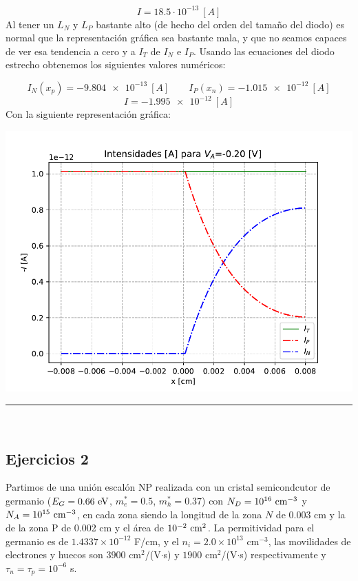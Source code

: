 \begin{enumerate}[label=\alph*)]
    \begin{equation}
        I =  18.5 \cdot 10^{-13} \ [\unit{A}]
    \end{equation}
    Al tener un $L_N$ y $L_P$ bastante alto (de hecho del orden del tamaño del diodo) es normal que la representación gráfica sea bastante mala, y que no seamos capaces de ver esa tendencia a cero y a $I_T$ de $I_N$ e $I_P$. Usando las ecuaciones del diodo estrecho obtenemos los siguientes valores numéricos: 

    \begin{equation}
        I_N(x_p)=\SI{-9.804e-13}{[A]} \qquad  
        I_P(x_n)=\SI{-1.015e-12}{[A]} 
    \end{equation}
    \begin{equation}
        I = \SI{-1.995e-12}{[A]}
    \end{equation}
    Con la siguiente representación gráfica:
    \begin{center}
    \includegraphics[width=0.6\linewidth]{Cuerpo/Ch_03/03_07_I.pdf}
    \end{center}

\end{enumerate}    

\rule{\textwidth}{0.1pt} \\[2pt]

\subsection{Ejercicios 2}

Partimos de una unión escalón NP realizada con un cristal semicondcutor de germanio ($E_G = 0.66 \ \eV$, $m_e^*=0.5$, $m_h^* = 0.37$) con $N_D=10^{16} \ \text{cm}^{-3}$ y $N_A = 10^{15} \ \text{cm}^{-3}$, en cada zona siendo la longitud de la zona $N$ de 0.003 cm y la de la zona P de 0.002 cm y el área de $10^{-2} \ \text{cm}^2$. La permitividad para el germanio es de $1.4337 \times 10^{-12}$ F/cm, y el $n_i=2.0 \times 10^{13}$ cm$^{-3}$, las movilidades de electrones y huecos son $3900$ cm$^2$/(V$\cdot$s) y $1900$ cm$^2$/(V$\cdot$s) respectivamente y $\tau_n=\tau_p=10^{-6}$ s.


